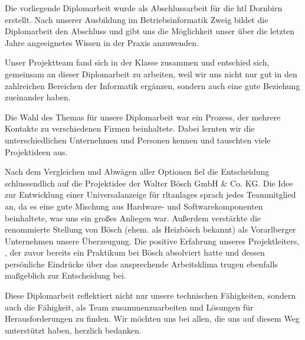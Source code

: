 Die vorliegende Diplomarbeit wurde als Abschlussarbeit für die \ac{htl} Dornbirn erstellt. Nach unserer Ausbildung im Betriebsinformatik Zweig bildet die Diplomarbeit den Abschluss und gibt uns die Möglichkeit unser über die letzten Jahre angeeignetes Wissen in der Praxis anzuwenden.

Unser Projektteam fand sich in der Klasse zusammen und entschied sich, gemeinsam an dieser Diplomarbeit zu arbeiten, weil wir uns nicht nur gut in den zahlreichen Bereichen der Informatik ergänzen, sondern auch eine gute Beziehung zueinander haben.

Die Wahl des Themas für unsere Diplomarbeit war ein Prozess, der mehrere Kontakte zu verschiedenen Firmen beinhaltete. Dabei lernten wir die unterschiedlichen Unternehmen und Personen kennen und tauschten viele Projektideen aus.

Nach dem Vergleichen und Abwägen aller Optionen fiel die Entscheidung schlussendlich auf die Projektidee der Walter Bösch GmbH \& Co. KG. Die Idee zur Entwicklung einer Universalanzeige für \aclp{rltanlage} sprach jedes Teammitglied an, da es eine gute Mischung aus Hardware- und Softwarekomponenten beinhaltete, was uns ein großes Anliegen war. Außerdem verstärkte die renommierte Stellung von Bösch (ehem. als Heizbösch bekannt) als Vorarlberger Unternehmen unsere Überzeugung. Die positive Erfahrung unseres Projektleiters, \mangeng, der zuvor bereits ein Praktikum bei Bösch absolviert hatte und dessen persönliche Eindrücke über das ansprechende Arbeitsklima trugen ebenfalls maßgeblich zur Entscheidung bei.

Diese Diplomarbeit reflektiert nicht nur unsere technischen Fähigkeiten, sondern auch die Fähigkeit, als Team zusammenzuarbeiten und Lösungen für Herausforderungen zu finden. Wir möchten uns bei allen, die uns auf diesem Weg unterstützt haben, herzlich bedanken.
